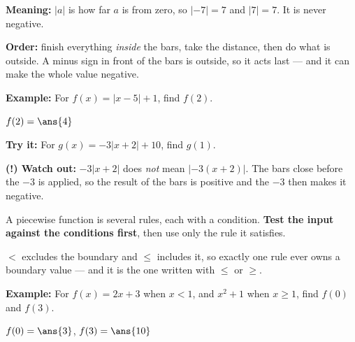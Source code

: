 \documentclass[12pt]{article}
\begin{document}


\begin{formulabox}
\textbf{Meaning:} \quad $|a|$ is how far $a$ is from zero, so $|{-7}| = 7$ and $|7| = 7$. It is never negative.\par\smallskip
\textbf{Order:} finish everything \emph{inside} the bars, take the distance, then do what is outside. A minus sign in front of the bars is outside, so it acts last --- and it can make the whole value negative.
\end{formulabox}

\begin{examplebox}
\textbf{Example:} \quad For $f(x) = |x-5| + 1$, find $f(2)$.
\par
$f(2) = \ans{4}$
\end{examplebox}

\begin{tryitbox}
\textbf{Try it:} \quad For $g(x) = -3|x+2| + 10$, find $g(1)$.\\[2pt]
\end{tryitbox}

\begin{watchoutbox}
\textbf{(!) Watch out:} $-3|x+2|$ does \emph{not} mean $|-3(x+2)|$. The bars close before the $-3$ is applied, so the result of the bars is positive and the $-3$ then makes it negative.
\end{watchoutbox}


\begin{formulabox}
A piecewise function is several rules, each with a condition. \textbf{Test the input against the conditions first}, then use only the rule it satisfies.\par\smallskip
$<$ excludes the boundary and $\le$ includes it, so exactly one rule ever owns a boundary value --- and it is the one written with $\le$ or $\ge$.
\end{formulabox}

\begin{examplebox}
\textbf{Example:} \quad For $f(x) = 2x+3$ when $x < 1$, and $x^2+1$ when $x \ge 1$, find $f(0)$ and $f(3)$.
\par
$f(0) = \ans{3}$, \quad $f(3) = \ans{10}$
\end{examplebox}
\end{document}
